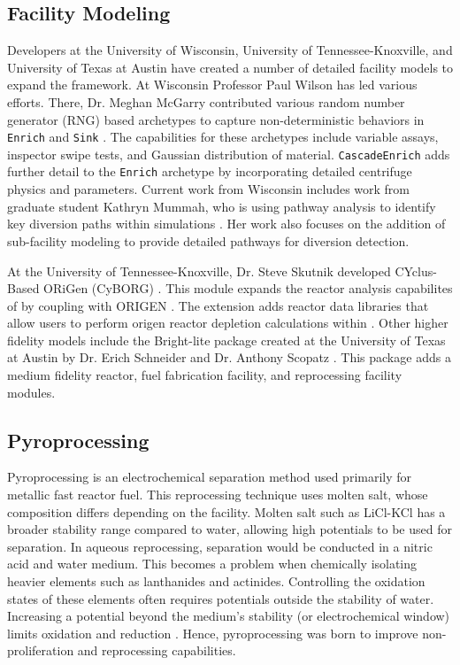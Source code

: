 \subsection{Facility Modeling}
Developers at the University of Wisconsin, University of Tennessee-Knoxville, and University of Texas at Austin have created a number of detailed facility models to expand the \Cyclus framework. At Wisconsin Professor Paul Wilson has led various efforts. There, Dr. Meghan McGarry contributed various random number generator (RNG) based archetypes to capture non-deterministic behaviors in \texttt{Enrich} and \texttt{Sink} \cite{mcgarry_mbmore_2017}. The capabilities for these archetypes include variable assays, inspector swipe tests, and Gaussian distribution of material. \texttt{CascadeEnrich} adds further detail to the \texttt{Enrich} archetype by incorporating detailed centrifuge physics and parameters. Current work from Wisconsin includes work from graduate student Kathryn Mummah, who is using pathway analysis to identify key diversion paths within \Cyclus simulations \cite{mummah_material_2019}. Her work
also focuses on the addition of sub-facility modeling to provide detailed pathways for diversion detection.

At the University of Tennessee-Knoxville, Dr. Steve Skutnik developed CYclus-Based ORiGen (CyBORG) \cite{skutnik_cyborg:_2016}. This module expands the reactor analysis capabilites of \Cyclus by coupling with ORIGEN \cite{bell_origen_1973}. The extension adds reactor data libraries that allow users to perform origen
reactor depletion calculations within \Cyclus. Other higher fidelity models include the Bright-lite package created at the University of Texas at Austin by Dr. Erich Schneider and Dr. Anthony Scopatz \cite{schneider_integrated_2016}. This package adds a medium fidelity reactor, fuel fabrication facility, and reprocessing facility modules.

\subsection{Pyroprocessing}
Pyroprocessing is an electrochemical separation method used primarily for metallic fast reactor fuel.
This reprocessing technique uses molten salt, whose composition differs depending on the facility.
Molten salt such as LiCl-KCl has a broader stability range compared to water, allowing high potentials to be used for separation.
In aqueous reprocessing, separation would be conducted in a nitric acid and water medium.
This becomes a problem when chemically isolating heavier elements such as lanthanides and actinides.
Controlling the oxidation states of these elements often requires potentials outside the stability of water. 
Increasing a potential beyond the medium's stability (or electrochemical window) limits oxidation and reduction \cite{hayyan_investigating_2013}.
Hence, pyroprocessing was born to improve non-proliferation and reprocessing capabilities.

